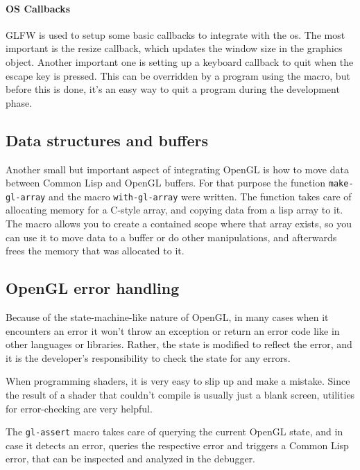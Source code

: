 \paragraph{OS Callbacks}

GLFW is used to setup some basic callbacks to integrate with the \ac{os}.
The most important is the resize callback,
which updates the window size in the graphics object.
Another important one is setting up a keyboard callback to quit when the escape key is pressed.
This can be overridden by a program using the macro,
but before this is done,
it's an easy way to quit a program during the development phase.

\subsection{Data structures and buffers}

Another small but important aspect of integrating OpenGL is how to move data between Common Lisp and OpenGL buffers.
For that purpose the function \texttt{make-gl-array} and the macro \texttt{with-gl-array} were written.
The function takes care of allocating memory for a C-style array,
and copying data from a lisp array to it.
The macro allows you to create a contained scope where that array exists,
so you can use it to move data to a buffer or do other manipulations,
and afterwards frees the memory that was allocated to it.

\subsection{OpenGL error handling}

Because of the state-machine-like nature of OpenGL,
in many cases when it encounters an error it won't throw an exception or return an error code like in other languages or libraries.
Rather,
the state is modified to reflect the error,
and it is the developer's responsibility to check the state for any errors.

When programming shaders,
it is very easy to slip up and make a mistake.
Since the result of a shader that couldn't compile is usually just a blank screen,
utilities for error-checking are very helpful.

The \texttt{gl-assert} macro takes care of querying the current OpenGL state,
and in case it detects an error,
queries the respective error and triggers a Common Lisp error,
that can be inspected and analyzed in the debugger.
